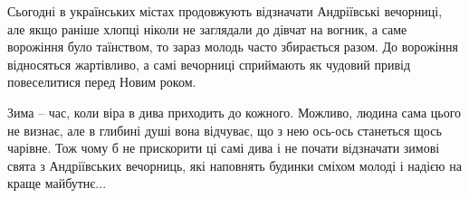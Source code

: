 Сьогодні в українських містах продовжують відзначати Андріївські вечорниці, але
якщо раніше хлопці ніколи не заглядали до дівчат на вогник, а саме ворожіння
було таїнством, то зараз молодь часто збирається разом. До ворожіння
відносяться жартівливо, а самі вечорниці сприймають як чудовий привід
повеселитися перед Новим роком.

Зима – час, коли віра в дива приходить до кожного. Можливо, людина сама цього
не визнає, але в глибині душі вона відчуває, що з нею ось-ось станеться щось
чарівне. Тож чому б не прискорити ці самі дива і не почати відзначати зимові
свята з Андріївських вечорниць, які наповнять будинки сміхом молоді і надією на
краще майбутнє...
